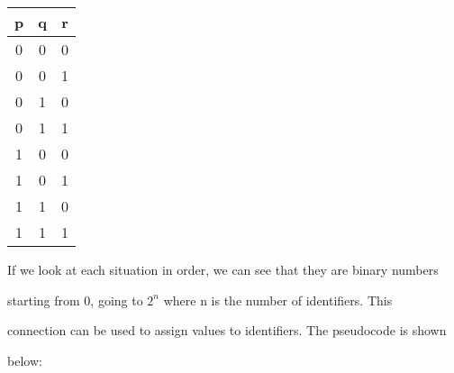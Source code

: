 \documentclass{report}
\begin{document}
\begin{center}

  \begin{tabular}{| c | c | c |}

    \hline

    p & q & r\\ \hline

    0 & 0 & 0 \\

    0 & 0 & 1 \\

		0 & 1 & 0 \\

		0 & 1 & 1 \\

		1 & 0 & 0 \\

		1 & 0 & 1 \\

    1 & 1 & 0 \\

    1 & 1 & 1 \\ \hline

  \end{tabular}

\end{center}



If we look at each situation in order, we can see that they are binary numbers

starting from 0, going to $2^n$ where n is the number of identifiers. This

connection can be used to assign values to identifiers. The pseudocode is shown

below:



\end{document}
